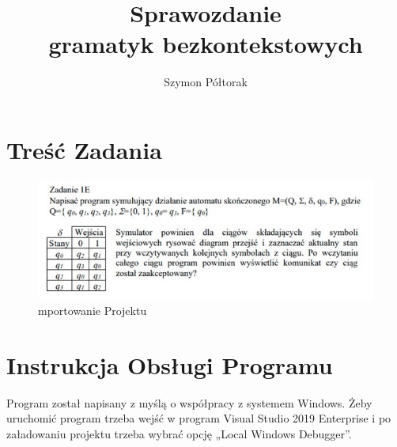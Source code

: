 \documentclass[10pt, a4paper]{report}
\title{\huge{\textbf{Sprawozdanie}}\\ gramatyk bezkontekstowych}
\author{Szymon Półtorak}
\date{}
\begin{document}
    \maketitle

    \renewcommand*\thesection{\arabic{section}} 
    
    \pagestyle{fancy}
    \fancyhf{}
    
    \tableofcontents
    \newpage

    \section{Treść Zadania}
    \begin{figure}[h]
        \begin{center}
            \includegraphics[scale=0.8]{photo1.jpg}
            \caption{mportowanie Projektu}
        \end{center}
    \end{figure}

    \section{Instrukcja Obsługi Programu}
    Program został napisany z myślą o współpracy z systemem Windows.
    Żeby uruchomić program trzeba wejść w program Visual Studio 2019 Enterprise i po załadowaniu projektu trzeba wybrać
    opcję „Local Windows Debugger”.
\end{document}
